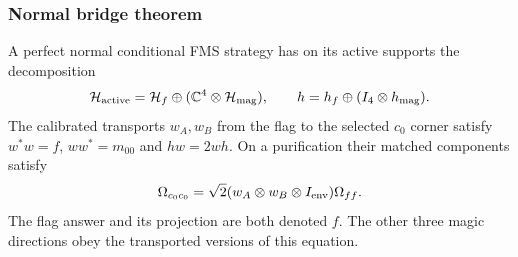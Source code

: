 \subsubsection{Normal bridge theorem}
\begin{lemma}\label{lem:bridge}
A perfect normal conditional FMS strategy has on its active supports the decomposition
\[
 \mathcal H_{\rm active}=\mathcal H_f\oplus(\mathbb C^4\otimes\mathcal H_{\rm mag}),
 \qquad h=h_f\oplus(I_4\otimes h_{\rm mag}).
\]
The calibrated transports $w_A,w_B$ from the flag to the selected $c_0$ corner satisfy $w^*w=f$, $ww^*=m_{00}$ and $hw=2wh$. On a purification their matched components satisfy
\begin{equation}\label{eq:bridgevector}
 \Omega_{c_0c_0}=\sqrt2(w_A\otimes w_B\otimes I_{\rm env})\Omega_{ff}.
\end{equation}
The flag answer and its projection are both denoted $f$. The other three magic directions obey the transported versions of this equation.
\end{lemma}
